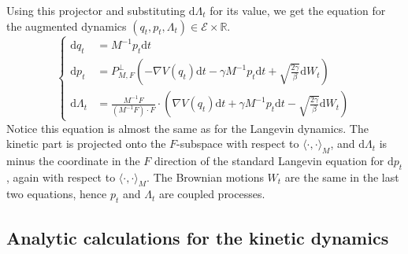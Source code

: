 \documentclass[a4paper,10pt,twoside,leqno]{report}
\newcommand{\R}{\mathbb{R}}
\newcommand{\dif}{\mathrm{d}}
\newcommand{\1}{\mathbbm{1}}
\begin{document}
    Using this projector and substituting $\dif \Lambda_t$ for its value, we get the equation for the augmented dynamics $(q_t,p_t,\Lambda_t)\in \mathcal E\times \R$.
    \begin{equation}
        \label{eq:norton_final_sde}
        \left\{\begin{aligned}
            \dif q_t &= M^{-1}p_t\dif t\\
            \dif p_t &= P_{M,F}^\perp\left(-\nabla V(q_t)\dif t -\gamma M^{-1}p_t\dif t +\sqrt{\frac{2\gamma}\beta}\dif W_t\right)\\
            \dif \Lambda_t &=\frac{M^{-1}F}{\left(M^{-1}F\right)\cdot F}\cdot\left(\nabla V(q_t)\dif t +\gamma M^{-1}p_t\dif t-\sqrt{\frac{2\gamma}\beta}\dif W_t\right)
        \end{aligned}\right.
    \end{equation}
    Notice this equation is almost the same as for the Langevin dynamics.
    The kinetic part is projected onto the $F$-subspace with respect to $\langle \cdot,\cdot\rangle_M$, and $\dif\Lambda_t$ is minus the coordinate in the $F$ direction of the standard Langevin equation for $\dif p_t$, again with respect to $\langle \cdot ,\cdot \rangle_M$.
    The Brownian motions $W_t$ are the same in the last two equations, hence $p_t$ and $\Lambda_t$ are coupled processes.
    
    \subsection{Analytic calculations for the kinetic dynamics}
    
\end{document}
